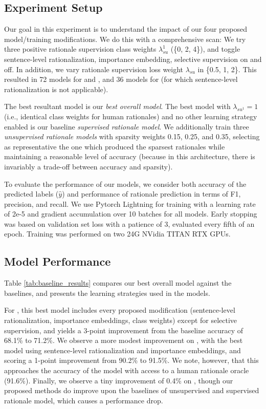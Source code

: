 \subsection{Experiment Setup}

Our goal in this experiment is to understand the impact of 
our four proposed model/training modifications.
We do this with a comprehensive scan: 
We try three positive rationale supervision class weights $\lambda_{su}^1$ (\{0, 2, 4\}), and toggle sentence-level rationalization, importance embedding, selective supervision on and off.
In addition, we vary rationale supervision loss weight $\lambda_{su}$ in \{0.5, 1, 2\}.
This resulted in 72 models for \multirc and \fever, and 36 models for \esnli (for which sentence-level rationalization is not applicable). 

The best resultant model is our {\em best overall model}.
The best model with $\lambda_{su^1}=1$ (i.e., identical class weights for human rationales) and no other learning strategy enabled is our baseline {\em supervised rationale model}.
We additionally train three {\em unsupervised rationale models} with sparsity weights 0.15, 0.25, and 0.35, selecting as representative the one which produced the sparsest rationales while maintaining a reasonable level of accuracy (because in this architecture, there is invariably a trade-off between accuracy and sparsity). 


To evaluate the performance of our models, we consider both accuracy of the predicted labels ($\hat{y}$) and performance of rationale prediction in terms of F1, precision, and recall.
We use Pytorch Lightning \citep{falcon2019pytorch} for training with a learning rate of 2e-5 and gradient accumulation over 10 batches for all models. Early stopping was based on validation set loss with a patience of 3, evaluated every fifth of an epoch. Training was performed 
on two 24G NVidia TITAN RTX GPUs. 


\subsection{Model Performance}
\label{subsec:p06_results_baseline_comparison}



Table \ref{tab:baseline_results} compares our best overall model against the baselines, and presents the learning strategies used in the models.

For \multirc, this best model includes every proposed modification (sentence-level rationalization, importance embeddings, class weights) except for selective supervision, and yields a 3-point improvement from the baseline accuracy of 68.1\% to 71.2\%. 
We observe a more modest improvement on \fever, with the best model using sentence-level rationalization and importance embeddings, and scoring a 1-point improvement from 90.2\% to 91.5\%. We note, however, that this approaches the accuracy of the model with access to a human rationale oracle (91.6\%).
Finally, we observe a tiny improvement of 0.4\% on \esnli, though our proposed methods do improve upon the baselines of unsupervised and supervised rationale model, which causes a performance drop. 

